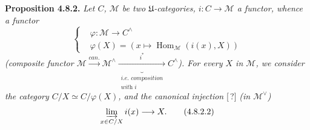 \documentclass[11pt]{article}
\newcommand{\Hom}{\operatorname{Hom}}
\begin{document}
\textbf{Proposition 4.8.2.} \textit{Let $C$, $\mathcal{M}$ be two $\mathfrak{U}$-categories, $i : C \longrightarrow \mathcal{M}$ a functor, whence a functor}
\[ \left\{\begin{aligned}
&\varphi : \mathcal{M} \longrightarrow C^{\wedge}\\
&\varphi(X) = (x \longmapsto \Hom_{\mathcal{M}}(i(x),X))
\end{aligned}\right. \tag*{(4.8.2.1)} \]
\textit{(composite functor $\mathcal{M} \xrightarrow{\textit{can.}} \mathcal{M}^{\wedge} \underbrace{\xrightarrow{i^*}}_{\substack{\textit{i.e. composition}\\ \textit{with } i}} C^{\wedge}$). For every $X$ in $\mathcal{M}$, we consider the category $C/X \simeq C/\varphi(X)$, and the canonical injection} [\,?] \textit{(in $\mathcal{M}^{\vee}$)}
\[ \varinjlim_{x\in C/X} i(x) \longrightarrow X . \tag*{(4.8.2.2)} \]
\end{document}

